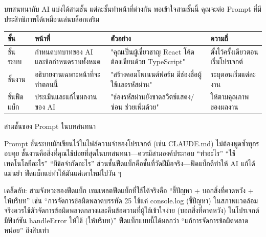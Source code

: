 


บทสนทนากับ AI แบ่งได้สามชั้น แต่ละชั้นทำหน้าที่ต่างกัน พอเข้าใจสามชั้นนี้ คุณจะต่อ Prompt ที่มีประสิทธิภาพได้เหมือนเล่นบล็อกเสริม

\begin{center}
\begin{tabularx}{\linewidth}{|X|X|X|X|}
\hline
\textbf{ชั้น} & \textbf{หน้าที่} & \textbf{ตัวอย่าง} & \textbf{ความถี่} \tabularnewline
\hline
ชั้นระบบ & กำหนดบทบาทของ AI และข้อกำหนดรวมทั้งหมด & "คุณเป็นผู้เชี่ยวชาญ React โค้ดต้องเขียนด้วย TypeScript" & ตั้งไว้ครั้งเดียวตอนเริ่มโปรเจกต์ \tabularnewline
ชั้นงาน & อธิบายงานเฉพาะหน้าที่จะทำตอนนี้ & "สร้างคอมโพเนนต์ฟอร์ม มีช่องชื่อผู้ใช้และรหัสผ่าน" & ระบุตอนเริ่มแต่ละงาน \tabularnewline
ชั้นฟีดแบ็ก & ประเมินและแก้ไขผลงานของ AI & "ช่องรหัสผ่านยังขาดสวิตช์แสดง/ซ่อน ช่วยเพิ่มด้วย" & ให้ตามคุณภาพของผลงาน \tabularnewline
\hline
\end{tabularx}
\end{center}

\begin{center}\small\color{gray}สามชั้นของ Prompt ในบทสนทนา\end{center}

Prompt ชั้นระบบมักเขียนไว้ในไฟล์ความจำของโปรเจกต์ (เช่น CLAUDE.md) ไม่ต้องพูดซ้ำทุกรอบคุย ชั้นงานคือสิ่งที่คุณใช้บ่อยที่สุดในบทสนทนา—ควรมีสามองค์ประกอบ “ทำอะไร” “ใช้เทคโนโลยีอะไร” “มีข้อจำกัดอะไร” ส่วนชั้นฟีดแบ็กคือชั้นที่วัดฝีมือจริง—ฟีดแบ็กดีทำให้ AI แก้ได้แม่นยำ ฟีดแบ็กแย่ทำให้มันแค่เดาใหม่ไปวัน ๆ

\begin{tcbinfo}{เคล็ดลับ: สามจังหวะของฟีดแบ็ก}
เทมเพลตฟีดแบ็กที่ใช้ได้จริงคือ “ชี้ปัญหา + บอกสิ่งที่คาดหวัง + ให้บริบท” เช่น “การจัดการข้อผิดพลาดบรรทัด 25 ใช้แค่ console.log (ชี้ปัญหา) ในสภาพแวดล้อมจริงควรใช้ตัวจัดการข้อผิดพลาดกลางและคืนข้อความที่ผู้ใช้เข้าใจง่าย (บอกสิ่งที่คาดหวัง) ในโปรเจกต์มีฟังก์ชัน handleError ให้ใช้ (ให้บริบท)” ฟีดแบ็กแบบนี้ได้ผลกว่า “แก้การจัดการข้อผิดพลาดหน่อย” ถึงสิบเท่า

\end{tcbinfo}

